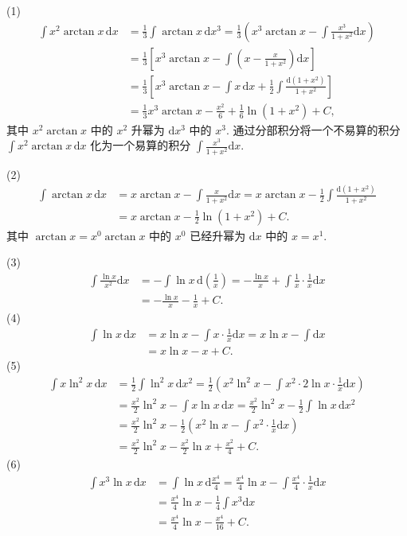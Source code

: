\begin{solution}
(1)
\begin{align*}
\int x^{2}\arctan x\,\mathrm{d}x&=\frac{1}{3}\int\arctan x\,\mathrm{d}x^{3}
=\frac{1}{3}\left(x^{3}\arctan x-\int\frac{x^{3}}{1+x^{2}}\mathrm{d}x\right)\\
&=\frac{1}{3}\left[x^{3}\arctan x-\int\left(x-\frac{x}{1+x^{2}}\right)\mathrm{d}x\right]\\
&=\frac{1}{3}\left[x^{3}\arctan x-\int x\,\mathrm{d}x+\frac{1}{2}\int\frac{\mathrm{d}(1+x^{2})}{1+x^{2}}\right]\\
&=\frac{1}{3}x^{3}\arctan x-\frac{x^{2}}{6}+\frac{1}{6}\ln(1+x^{2})+C,
\end{align*}
其中 $x^{2}\arctan x$ 中的 $x^{2}$ 升幂为 $\mathrm{d}x^{3}$ 中的 $x^{3}$. 通过分部积分将一个不易算的积分\linebreak[4]$\int x^{2}\arctan x\,\mathrm{d}x$ 化为一个易算的积分 $\int\frac{x^{3}}{1+x^{2}}\mathrm{d}x$.

(2)
\begin{align*}
\int\arctan x\,\mathrm{d}x&=x\arctan x-\int\frac{x}{1+x^{2}}\mathrm{d}x=x\arctan x-\frac{1}{2}\int\frac{\mathrm{d}(1+x^{2})}{1+x^{2}}\\
&=x\arctan x-\frac{1}{2}\ln(1+x^{2})+C.
\end{align*}
其中 $\arctan x=x^{0}\arctan x$ 中的 $x^{0}$ 已经升幂为 $\mathrm{d}x$ 中的 $x=x^{1}$.

(3)
\begin{align*}
\int\frac{\ln x}{x^{2}}\mathrm{d}x&=-\int\ln x\,\mathrm{d}\left(\frac{1}{x}\right)=-\frac{\ln x}{x}+\int\frac{1}{x}\cdot\frac{1}{x}\mathrm{d}x\\
&=-\frac{\ln x}{x}-\frac{1}{x}+C.
\end{align*}
(4)
\begin{align*}
\int\ln x\,\mathrm{d}x&=x\ln x-\int x\cdot\frac{1}{x}\mathrm{d}x=x\ln x-\int\mathrm{d}x\\
&=x\ln x-x+C.
\end{align*}
(5)
\begin{align*}
\int x\ln^{2}x\,\mathrm{d}x&=\frac{1}{2}\int\ln^{2}x\,\mathrm{d}x^{2}=\frac{1}{2}\left(x^{2}\ln^{2}x-\int x^{2}\cdot 2\ln x\cdot\frac{1}{x}\mathrm{d}x\right)\\
&=\frac{x^{2}}{2}\ln^{2}x-\int x\ln x\,\mathrm{d}x=\frac{x^{2}}{2}\ln^{2}x-\frac{1}{2}\int\ln x\,\mathrm{d}x^{2}\\
&=\frac{x^{2}}{2}\ln^{2}x-\frac{1}{2}\left(x^{2}\ln x-\int x^{2}\cdot\frac{1}{x}\mathrm{d}x\right)\\
&=\frac{x^{2}}{2}\ln^{2}x-\frac{x^{2}}{2}\ln x+\frac{x^{2}}{4}+C.
\end{align*}
(6)
\begin{align*}
\int x^{3}\ln x\,\mathrm{d}x&=\int\ln x\,\mathrm{d}\frac{x^{4}}{4}=\frac{x^{4}}{4}\ln x-\int\frac{x^{4}}{4}\cdot\frac{1}{x}\mathrm{d}x\\
&=\frac{x^{4}}{4}\ln x-\frac{1}{4}\int x^{3}\mathrm{d}x\\
&=\frac{x^{4}}{4}\ln x-\frac{x^{4}}{16}+C.
\end{align*}
\end{solution}


